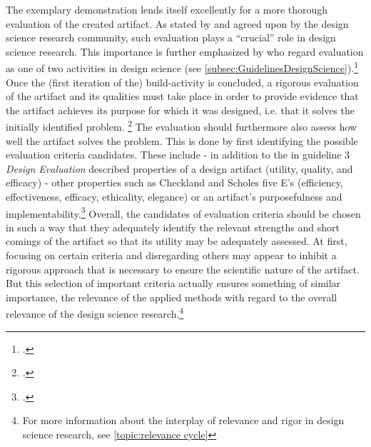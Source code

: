 The exemplary demonstration lends itself excellently for a more thorough evaluation of the created artifact. As stated by \cite{HevnerDesignScienceResearch2004} and agreed upon by the design science research community, such evaluation plays a \enquote{crucial} role in design science research. This importance is further emphasized by \cite{MarchDesignnaturalscience1995} who regard evaluation as one of two activities in design science (see \ref{subsec:GuidelinesDesignScience}).\footcites[Cf.][p.258]{MarchDesignnaturalscience1995}[Cf. in addition][]{PfeffersDesignScienceResearch2007}{HevnerDesignScienceResearch2004}{Pries-HejeComprehensiveFrameworkEvaluation2012}{Pries-HejeStrategiesDesignScience} Once the (first iteration of the) build-activity is concluded, a rigorous evaluation of the artifact and its qualities must take place in order to provide evidence that the artifact achieves its purpose for which it was designed, i.e. that it solves the initially identified problem. \footcites[Cf.][p.425]{Pries-HejeComprehensiveFrameworkEvaluation2012} The evaluation should furthermore also assess how well the artifact solves the problem. This is done by first identifying the possible evaluation criteria candidates. These include - in addition to the in guideline 3 \textit{Design Evaluation} described properties of a design artifact (utility, quality, and efficacy) - other properties such as Checkland and Scholes five E's (efficiency, effectiveness, efficacy, ethicality, elegance) or an artifact's purposefulness and implementability.\footcites[Cf.][p.427]{Pries-HejeComprehensiveFrameworkEvaluation2012}[cf. in addition][]{ChecklandSoftSystemsMethodology1990}
Overall, the candidates of evaluation criteria should be chosen in such a way that they adequately identify the relevant strengths and short comings of the artifact so that its utility may be adequately assessed. At first, focusing on certain criteria and disregarding others may appear to inhibit a rigorous approach that is necessary to ensure the scientific nature of the artifact. But this selection of important criteria actually ensures something of similar importance, the relevance of the applied methods with regard to the overall relevance of the design science research.\footnote{For more information about the interplay of relevance and rigor in design science research, see \ref{topic:relevance cycle}}


